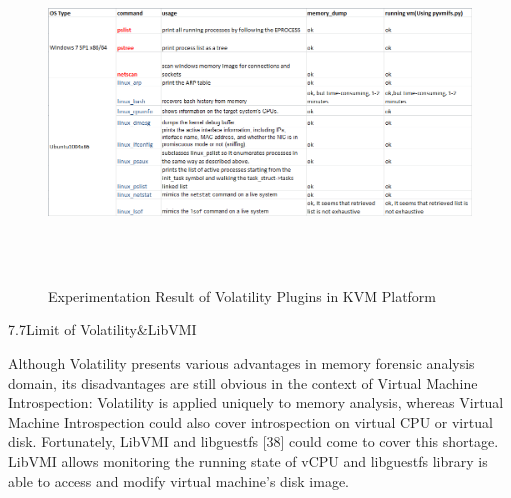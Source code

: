 \begin{figure}[htbp]
	\centering
		\includegraphics[width=14cm, height= 9cm ]{Figures/Figure31.png}
	\caption[Experimentation Result of Volatility Plugins in KVM Platform]{Experimentation Result of Volatility Plugins in KVM Platform}
	\label{fig:Experimentation Result of Volatility Plugins in KVM Platform}
\end{figure}

7.7Limit of Volatility\&LibVMI

Although Volatility presents various advantages in memory forensic analysis domain, its disadvantages are still obvious in the context 
of Virtual Machine Introspection: Volatility is applied uniquely to memory analysis, whereas Virtual Machine Introspection could also 
cover introspection on virtual CPU or virtual disk. Fortunately, LibVMI and libguestfs [38] could come to cover this shortage. 
LibVMI allows monitoring the running state of vCPU and libguestfs library is able to access and modify virtual machine’s disk image. 







